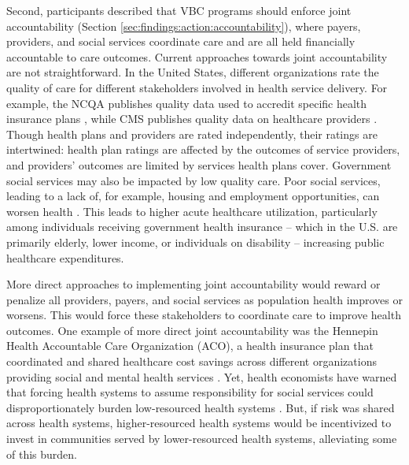 Second, participants described that VBC programs should enforce joint accountability (Section \ref{sec:findings:action:accountability}), where payers, providers, and social services coordinate care and are all held financially accountable to care outcomes.
Current approaches towards joint accountability are not straightforward.
In the United States, different organizations rate the quality of care for different stakeholders involved in health service delivery.
For example, the NCQA publishes quality data used to accredit specific health insurance plans \cite{ncqa_health_2024}, while CMS publishes quality data on healthcare providers \cite{cms_quality_2024}.
Though health plans and providers are rated independently, their ratings are intertwined: health plan ratings are affected by the outcomes of service providers, and providers' outcomes are limited by services health plans cover.
Government social services may also be impacted by low quality care. 
Poor social services, leading to a lack of, for example, housing and employment opportunities, can worsen health \cite{bambra_tackling_2010}.
This leads to higher acute healthcare utilization, particularly among individuals receiving government health insurance -- which in the U.S. are primarily elderly, lower income, or individuals on disability \cite{keisler-starkey_health_2023} -- increasing public healthcare expenditures.

More direct approaches to implementing joint accountability would reward or penalize all providers, payers, and social services as population health improves or worsens.
This would force these stakeholders to coordinate care to improve health outcomes.
One example of more direct joint accountability was the Hennepin Health Accountable Care Organization (ACO), a health insurance plan that coordinated and shared healthcare cost savings across different organizations providing social and mental health services \cite{vickery_changes_2020}.
Yet, health economists have warned that forcing health systems to assume responsibility for social services could disproportionately burden low-resourced health systems \cite{glied_health_2023}. 
But, if risk was shared across health systems, higher-resourced health systems would be incentivized to invest in communities served by lower-resourced health systems, alleviating some of this burden.

